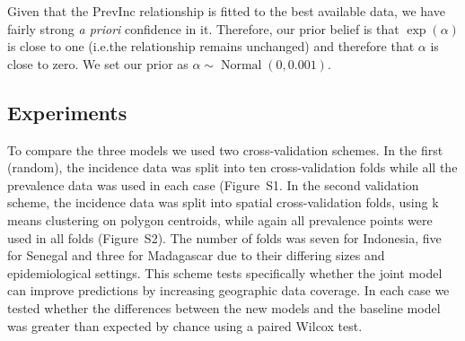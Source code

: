\documentclass{statsoc}
\begin{document}
Given that the PrevInc relationship is fitted to the best available data, we have fairly strong \emph{a priori} confidence in it.
Therefore, our prior belief is that $\exp(\alpha)$ is close to one (i.e.\thinspace the relationship remains unchanged) and therefore that $\alpha$ is close to zero.
We set our prior as $\alpha \sim \operatorname{Normal}(0, 0.001)$.


\subsection*{Experiments}

To compare the three models we used two cross-validation schemes. 
In the first (random), the incidence data was split into ten cross-validation folds while all the prevalence data was used in each case (Figure~S1. 
In the second validation scheme, the incidence data was split into spatial cross-validation folds, using k means clustering on polygon centroids, while again all prevalence points were used in all folds (Figure~S2).
The number of folds was seven for Indonesia, five for Senegal and three for Madagascar due to their differing sizes and epidemiological settings.
This scheme tests specifically whether the joint model can improve predictions by increasing geographic data coverage.
In each case we tested whether the differences between the new models and the baseline model was greater than expected  by chance using a paired Wilcox test.



\begin{table}
\caption{\label{table1}Summary of out-of-sample accuracy for all cross-validation experiments. 
Mean absolute error of predicted incidence rate against out-of-sample observed data for three countries. 
The best performing model in each case is shown in bold.
Results that are significantly better or worse than the baseline (at the 95\% significance level) are indicated with a dagger.
}
\centering
{}
\end{table}
\end{document}
